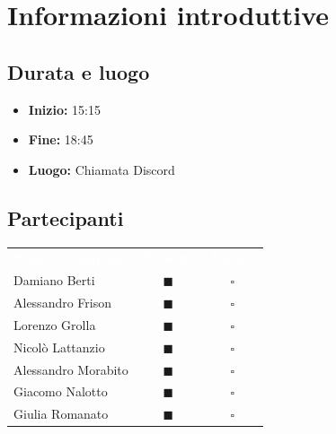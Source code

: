 \documentclass[a4paper, 11pt]{article}
\begin{document}

\section{Informazioni introduttive}

\subsection{Durata e luogo}
\begin{itemize}
    \item \textbf{Inizio:} 15:15
    \item \textbf{Fine:} 18:45
    \item \textbf{Luogo:} Chiamata Discord
\end{itemize}

\subsection{Partecipanti}
\begin{center}
    \begin{tabular}{>{\raggedright\arraybackslash}p{6cm} c c}
        \rowcolor{AccentColor}
        \textcolor{white}{\textbf{Nome e Cognome}} & 
        \textcolor{white}{\textbf{Presente}} & 
        \textcolor{white}{\textbf{Assente}} \\
        
        Damiano Berti     & \textcolor{AccentColor}{$\blacksquare$}    & $\square$        \\
        Alessandro Frison     & \textcolor{AccentColor}{$\blacksquare$}    & $\square$        \\
        Lorenzo Grolla     & \textcolor{AccentColor}{$\blacksquare$}    & $\square$        \\
        Nicolò Lattanzio    & \textcolor{AccentColor}{$\blacksquare$}    & $\square$        \\
        Alessandro Morabito   & \textcolor{AccentColor}{$\blacksquare$}    & $\square$        \\
        Giacomo Nalotto   & \textcolor{AccentColor}{$\blacksquare$}    & $\square$        \\
        Giulia Romanato   & \textcolor{AccentColor}{$\blacksquare$}    & $\square$        \\
    \end{tabular}
\end{center}
\end{document}
